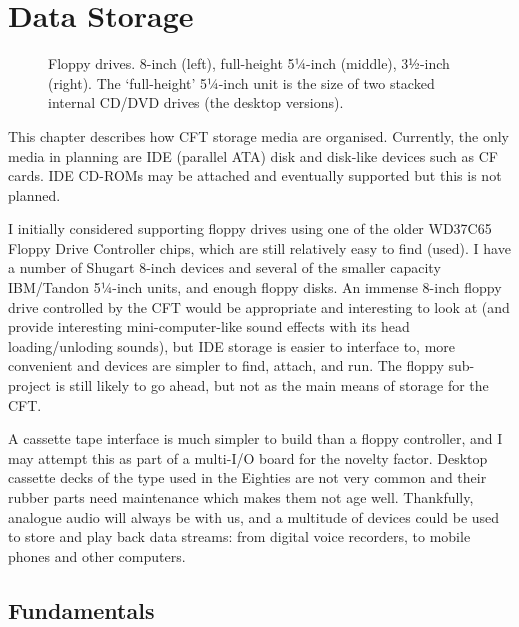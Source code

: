 



\chapter{Data Storage}
\label{sec:fs}

\begin{figure}
  \centering
  \caption[Floppy drives]{Floppy drives. 8-inch (left), full-height
    5¼-inch (middle), 3½-inch (right). The ‘full-height’ 5¼-inch unit
    is the size of two stacked internal CD/DVD drives (the desktop versions).}
\end{figure}


This chapter describes how CFT storage media are organised. Currently, the only
media in planning are IDE (parallel ATA) disk and disk-like devices such as CF
cards. IDE CD-ROMs may be attached and eventually supported but this is not
planned.

I initially considered supporting floppy drives using one of the older
WD37C65 Floppy Drive Controller chips, which are still relatively easy
to find (used). I have a number of Shugart 8-inch devices and several
of the smaller capacity IBM/Tandon 5¼-inch units, and enough floppy
disks. An immense 8-inch floppy drive controlled by the CFT would be
appropriate and interesting to look at (and provide interesting
mini-computer-like sound effects with its head loading/unloding
sounds), but IDE storage is easier to interface to, more convenient
and devices are simpler to find, attach, and run. The floppy
sub-project is still likely to go ahead, but not as the main means of
storage for the CFT.

A cassette tape interface is much simpler to build than a floppy
controller, and I may attempt this as part of a multi-I/O board for
the novelty factor. Desktop cassette decks of the type used in the
Eighties are not very common and their rubber parts need maintenance
which makes them not age well. Thankfully, analogue audio will always
be with us, and a multitude of devices could be used to store and play
back data streams: from digital voice recorders, to mobile phones and
other computers.

\section{Fundamentals}

